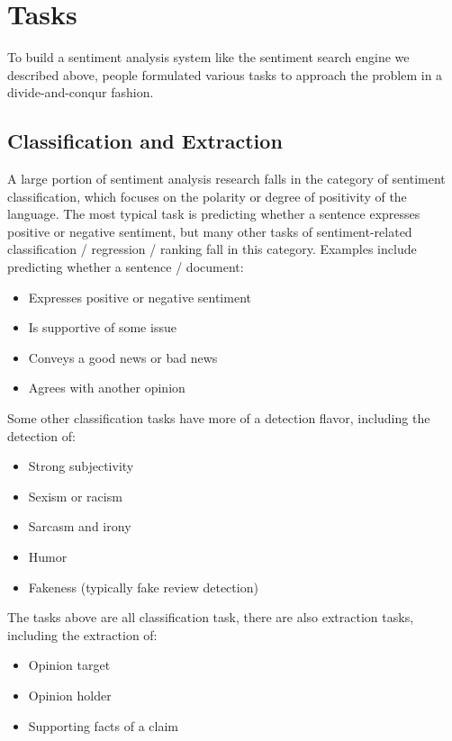 \section{Tasks}

To build a sentiment analysis system like the sentiment search engine we described above, people formulated various tasks to approach the problem in a divide-and-conqur fashion. 

\subsection{Classification and Extraction}

A large portion of sentiment analysis research falls in the category of sentiment classification, which focuses on the polarity or degree of positivity of the language. The most typical task is predicting whether a sentence expresses positive or negative sentiment, but many other tasks of sentiment-related classification / regression / ranking fall in this category. Examples include predicting whether a sentence / document:

\begin{itemize}
    \item Expresses positive or negative sentiment
    \item Is supportive of some issue
    \item Conveys a good news or bad news
    \item Agrees with another opinion
\end{itemize}

Some other classification tasks have more of a detection flavor, including the detection of:

\begin{itemize}
    \item Strong subjectivity
    \item Sexism or racism
    \item Sarcasm and irony
    \item Humor
    \item Fakeness (typically fake review detection)
\end{itemize}

The tasks above are all classification task, there are also extraction tasks, including the extraction of:

\begin{itemize}
    \item Opinion target
    \item Opinion holder
    \item Supporting facts of a claim
\end{itemize}

